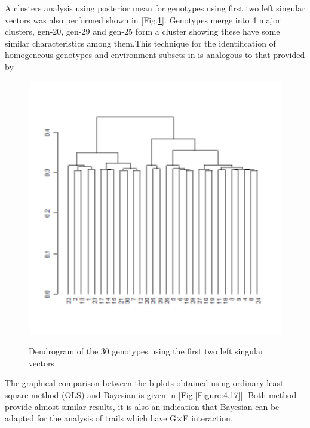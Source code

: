 A clusters analysis using posterior mean for genotypes using first two left singular vectors was also performed shown in [Fig.\ref{Figure:4.16}]. Genotypes merge into 4 major clusters, gen-20, gen-29 and gen-25 form a cluster showing these have some similar characteristics among them.This technique for the identification of homogeneous genotypes and environment subsets in is analogous to that provided by \citep{Burguenoa2008}
\begin{figure} [H]
	\centering  
	\scalebox{0.3}
	{\includegraphics[width=550mm]{02ThesisMain/Ch04RD/figures/row-cluster.pdf}}
	\caption[Bayesian dendrogram for genotpyes]{Dendrogram of the 30 genotypes using the first two left singular vectors}
\label{Figure:4.16}
\end{figure}

 The graphical comparison between the biplots obtained using ordinary least square method (OLS) and Bayesian is given in [Fig.\ref{Figure:4.17}]. Both method provide almost similar results, it is also an indication that Bayesian can be adapted for the analysis of trails which have G$\times$E interaction.   



